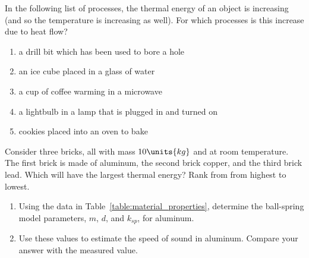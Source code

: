 \begin{problem}
  In the following list of processes, the thermal energy of an object
  is increasing (and so the temperature is increasing as well).  For
  which processes is this increase due to heat flow?
\begin{enumerate}
\item a drill bit which has been used to bore a hole
\item an ice cube placed in a glass of water
\item a cup of coffee warming in a microwave
\item a lightbulb in a lamp that is plugged in and turned on
\item cookies placed into an oven to bake
\end{enumerate}
\label{problem:heat_examples}
\end{problem}

\begin{problem}
  Consider three bricks, all with mass $10\units{kg}$ and at room
  temperature. The first brick is made of aluminum, the second brick
  copper, and the third brick lead.  Which will have the largest thermal
  energy?  Rank from from highest to lowest.
\label{problem:compare_heat_capacity}
\end{problem}

\begin{problem}
\begin{enumerate}
\item Using the data in Table~\ref{table:material_properties}, 
determine the ball-spring model
parameters, $m$, $d$, and $k_{sp}$, for aluminum.
\item Use these values to estimate the speed of sound in aluminum.  Compare
your answer with the measured value.
\end{enumerate}
\end{problem}


